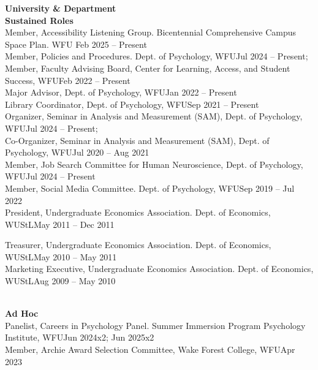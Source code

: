 {\large \textbf{University \& Department}}\\
\textrm{\textbf{Sustained Roles}}\\
Member, Accessibility Listening Group. \small{Bicentennial Comprehensive Campus Space Plan}. WFU \hfill{Feb 2025 – Present}\\ %
Member, Policies and Procedures. Dept. of Psychology, WFU\hfill{Jul 2024 – Present;}\newline 
{}\\
Member, Faculty Advising Board, Center for Learning, Access, and Student Success, WFU\hfill {Feb 2022 – Present}\\
Major Advisor, Dept. of Psychology, WFU\hfill{Jan 2022 – Present}\\
Library Coordinator, Dept. of Psychology, WFU\hfill {Sep 2021 – Present}\\
Organizer, Seminar in Analysis and Measurement (SAM), Dept. of Psychology, WFU\hfill{Jul 2024 – Present;}\newline 
{}\\
Co-Organizer, Seminar in Analysis and Measurement (SAM), Dept. of Psychology, WFU\hfill {Jul 2020 – Aug 2021}\\
Member, Job Search Committee for Human Neuroscience, Dept. of Psychology, WFU\hfill {Jul 2024 – Present}\\
Member, Social Media Committee. Dept. of Psychology, WFU\hfill {Sep 2019 – Jul 2022}\\
President, Undergraduate Economics Association. Dept. of Economics, WUStL\hfill{May 2011 – Dec 2011}\\
\begin{minipage}{\linewidth}\vspace{1.1mm} Treasurer, Undergraduate Economics Association. Dept. of Economics, WUStL\hfill{May 2010 – May 2011}\\
Marketing Executive, Undergraduate Economics Association. Dept. of Economics, WUStL\hfill {Aug 2009 – May 2010}\end{minipage}\medskip\\
\textrm{\textbf{Ad Hoc}}\\
Panelist, Careers in Psychology Panel. Summer Immersion Program Psychology Institute, WFU\hfill {Jun 2024x2; Jun 2025x2}\\ %
Member, Archie Award Selection Committee, Wake Forest College, WFU\hfill{Apr 2023}\\ 
